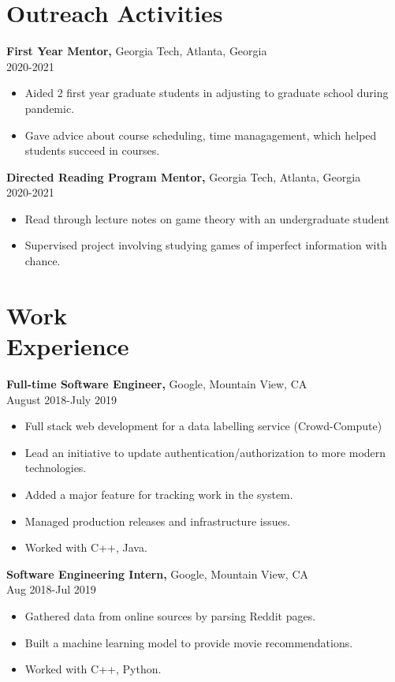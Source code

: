 \documentclass[margin]{res}
\begin{document}
\begin{resume}
\section{Outreach   Activities} 
       {\bf First Year Mentor,} Georgia Tech, Atlanta, Georgia     \\         2020-2021 
        \begin{itemize} \itemsep -2pt
            \item Aided 2 first year graduate students in adjusting to graduate school during pandemic.
          \item Gave advice about course scheduling, time managagement, which helped students succeed in courses.
		 \end{itemize}

       {\bf Directed Reading Program Mentor,} Georgia Tech, Atlanta, Georgia     \\         2020-2021 
        \begin{itemize} \itemsep -2pt
            \item Read through lecture notes on game theory with an undergraduate student
          \item Supervised project involving studying games of imperfect information with chance.
		 \end{itemize}

 \section{Work\\ Experience}
 {\bf Full-time Software Engineer,} Google, Mountain View, CA \\ August 2018-July 2019
 \begin{itemize} \itemsep -2pt  %
 \item Full stack web development for a data labelling service (Crowd-Compute)
 \item Lead an initiative to update authentication/authorization to more modern technologies.
 \item Added a major feature for tracking work in the system.
 \item Managed production releases and infrastructure issues.
 \item Worked with C++, Java.
 \end{itemize}
 
{\bf Software Engineering Intern,} Google, Mountain View, CA \\ Aug 2018-Jul 2019
\begin{itemize} \itemsep -2pt %
\item Gathered data from online sources by parsing Reddit pages.
\item Built a machine learning model to provide movie recommendations.
\item Worked with C++, Python.
\end{itemize}


\end{resume}
\end{document}
